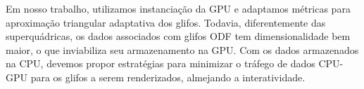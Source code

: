 Em nosso trabalho, utilizamos instanciação da GPU e adaptamos métricas para aproximação triangular adaptativa dos glifos. Todavia, diferentemente das superquádricas, os dados associados com glifos ODF tem dimensionalidade bem maior, o que inviabiliza seu armazenamento na GPU. Com os dados armazenados na CPU, devemos propor estratégias para minimizar o tráfego de dados CPU-GPU para os glifos a serem renderizados, almejando a interatividade.










